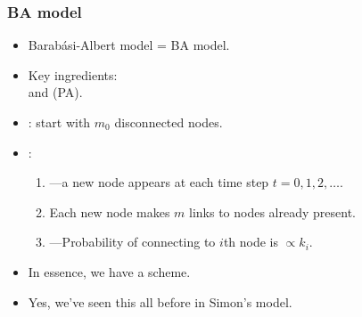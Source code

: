 
\begin{frame}[label=]
  \frametitle{BA model}
 
  \begin{block}{}
    \begin{itemize}
    \item<1-> 
      Barab\'{a}si-Albert model = BA model.
    \item<2-> 
      Key ingredients:\\
       and  (PA).
    \item<3-> 
      : start with $m_0$ disconnected nodes.
    \item<4-> 
      : 
      \begin{enumerate}
      \item<5->  
        ---a new node appears at each time step $t=0,1,2, \ldots$.
      \item<6-> 
        Each new node makes $m$ links to nodes already present.
      \item<7-> 
        ---Probability 
        of connecting to $i$th node is $\propto k_i$.
      \end{enumerate}
    \item<8->
      In essence, we have a  scheme.
    \item<9->
      Yes, we've seen this all before in Simon's model.
    \end{itemize}
  \end{block}

\end{frame}


